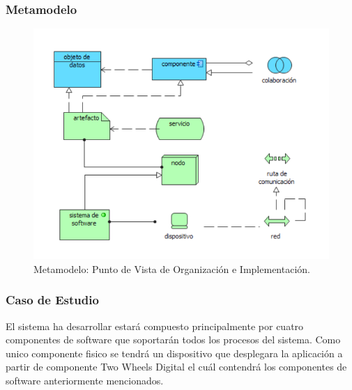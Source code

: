 \subsubsection{Metamodelo}
\begin{figure}[h]
	\centering
	\includegraphics[width=1.0\textwidth]{imagenes/Metamodelos/Tecnologia/meta_organizacion_implementacion.PDF}
	\caption{Metamodelo: Punto de Vista de Organización e Implementación.}
	\label{fig:gap_analysis}
\end{figure}

\subsubsection{Caso de Estudio}
El sistema ha desarrollar estará compuesto principalmente por cuatro componentes de software que soportarán todos los procesos del sistema. Como unico componente fisico se tendrá un dispositivo que desplegara la aplicación a partir de componente Two Wheels Digital el cuál contendrá los componentes de software anteriormente mencionados.

